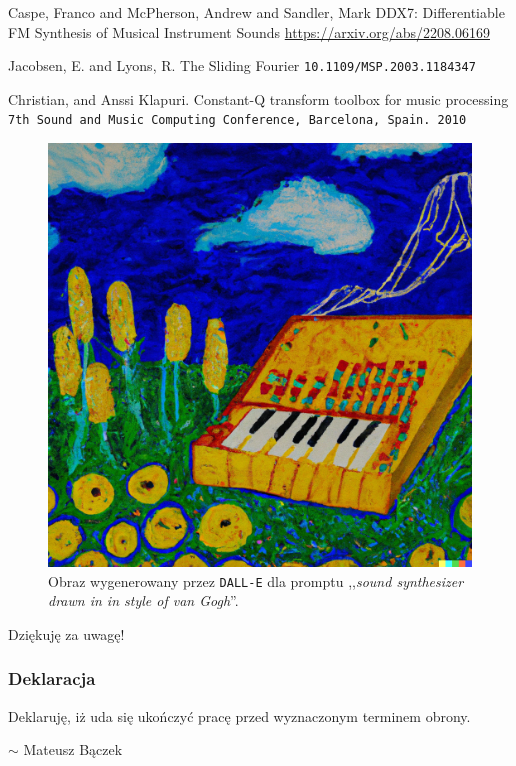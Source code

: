 \documentclass[]{beamer}
\begin{document}
\begin{frame}
  \begin{thebibliography}{99} %

     Caspe, Franco and McPherson, Andrew and Sandler, Mark
    \newblock DDX7: Differentiable FM Synthesis of Musical Instrument Sounds
    \newblock \url{https://arxiv.org/abs/2208.06169}

     Jacobsen, E. and Lyons, R.
    \newblock The Sliding Fourier
    \newblock \texttt{10.1109/MSP.2003.1184347}

     Christian, and Anssi Klapuri.
    \newblock Constant-Q transform toolbox for music processing
    \newblock \texttt{7th Sound and Music Computing Conference, Barcelona, Spain. 2010}

  \end{thebibliography}
\end{frame}

\begin{frame}

  \vspace{-0.5cm}
  \begin{figure}
    \includegraphics[width=0.4\linewidth]{van_gogh_synth.png}
    \caption{Obraz wygenerowany przez \texttt{DALL-E} dla promptu ,,\textit{sound synthesizer drawn in in style of van Gogh}''.}
  \end{figure}

  \centering
  \Large
  Dziękuję za uwagę!
\end{frame}

\begin{frame}
  \frametitle{Deklaracja}

  {
  \Large
  Deklaruję, iż uda się ukończyć pracę przed wyznaczonym terminem obrony.
  }

  $\sim$ Mateusz Bączek
\end{frame}
\end{document}

